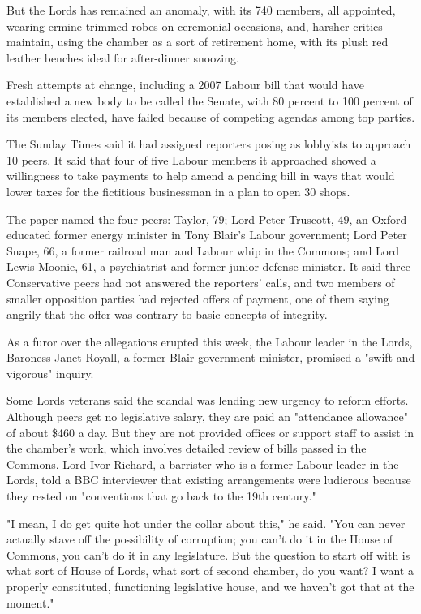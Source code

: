 But the Lords has remained an anomaly, with its 740 members, all
appointed, wearing ermine-trimmed robes on ceremonial occasions, and,
harsher critics maintain, using the chamber as a sort of retirement
home, with its plush red leather benches ideal for after-dinner
snoozing.

Fresh attempts at change, including a 2007 Labour bill that would have
established a new body to be called the Senate, with 80 percent to 100
percent of its members elected, have failed because of competing agendas
among top parties.

The Sunday Times said it had assigned reporters posing as lobbyists to
approach 10 peers. It said that four of five Labour members it
approached showed a willingness to take payments to help amend a pending
bill in ways that would lower taxes for the fictitious businessman in a
plan to open 30 shops.

The paper named the four peers: Taylor, 79; Lord Peter Truscott, 49, an
Oxford-educated former energy minister in Tony Blair's Labour
government; Lord Peter Snape, 66, a former railroad man and Labour whip
in the Commons; and Lord Lewis Moonie, 61, a psychiatrist and former
junior defense minister. It said three Conservative peers had not
answered the reporters' calls, and two members of smaller opposition
parties had rejected offers of payment, one of them saying angrily that
the offer was contrary to basic concepts of integrity.

As a furor over the allegations erupted this week, the Labour leader in
the Lords, Baroness Janet Royall, a former Blair government minister,
promised a "swift and vigorous" inquiry.

Some Lords veterans said the scandal was lending new urgency to reform
efforts. Although peers get no legislative salary, they are paid an
"attendance allowance" of about \$460 a day. But they are not provided
offices or support staff to assist in the chamber's work, which involves
detailed review of bills passed in the Commons. Lord Ivor Richard, a
barrister who is a former Labour leader in the Lords, told a BBC
interviewer that existing arrangements were ludicrous because they
rested on "conventions that go back to the 19th century."

"I mean, I do get quite hot under the collar about this," he said. "You
can never actually stave off the possibility of corruption; you can't do
it in the House of Commons, you can't do it in any legislature. But the
question to start off with is what sort of House of Lords, what sort of
second chamber, do you want? I want a properly constituted, functioning
legislative house, and we haven't got that at the moment."

